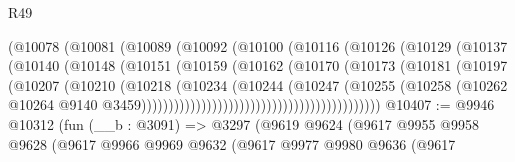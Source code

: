 \begin{lexlean}{R49}
\begin{coremodule}
                                      (@10078
                                        (@10081
                                          (@10089
                                            (@10092
                                              (@10100
                                                (@10116
                                                  (@10126
                                                    (@10129
                                                      (@10137
                                                        (@10140
                                                          (@10148
                                                            (@10151
                                                              (@10159
                                                                (@10162
                                                                  (@10170
                                                                    (@10173
                                                                      (@10181
                                                                        (@10197
                                                                          (@10207
                                                                            (@10210
                                                                              (@10218
                                                                                (@10234
                                                                                  (@10244
                                                                                    (@10247
                                                                                      (@10255
                                                                                        (@10258
                                                                                          (@10262
                                                                                            @10264
                                                                                            @9140
                                                                                            @3459))))))))))))))))))))))))))))))))))))))))))))
@10407 := @9946
    @10312
    (fun (__b : @3091) =>
    @3297
      (@9619
        @9624
        (@9617
          @9955
          @9958
          @9628
          (@9617
            @9966
            @9969
            @9632
            (@9617
              @9977
              @9980
              @9636
              (@9617

\end{coremodule}
\end{lexlean}

